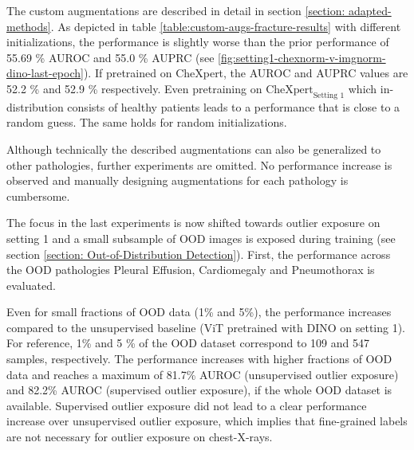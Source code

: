 The custom augmentations are described in detail in section \ref{section: adapted-methods}.
As depicted in table \ref{table:custom-augs-fracture-results} with different initializations, the performance is slightly worse than the prior performance of 55.69 \% AUROC  and 55.0 \% AUPRC (see \ref{fig:setting1-chexnorm-v-imgnorm-dino-last-epoch}).
If pretrained on CheXpert, the AUROC and AUPRC values are 52.2 \% and 52.9 \% respectively. 
Even pretraining on $\text{CheXpert}_\text{Setting 1}$ which in-distribution consists of healthy patients leads to a performance that is close to a random guess.
The same holds for random initializations.
\par
Although technically the described augmentations can also be generalized to other pathologies, further experiments are omitted.
No performance increase is observed and manually designing augmentations for each pathology is cumbersome.
\par
The focus in the last experiments is now shifted towards outlier exposure on setting 1 and a small subsample of OOD images is exposed during training (see section \ref{section: Out-of-Distribution Detection}).
First, the performance across the OOD pathologies Pleural Effusion, Cardiomegaly and Pneumothorax is evaluated.
\par
Even for small fractions of OOD data (1\% and 5\%), the performance increases compared to the unsupervised baseline (ViT pretrained with DINO on setting 1).
For reference, 1\% and 5 \% of the OOD dataset correspond to 109 and 547 samples, respectively.
The performance increases with higher fractions of OOD data and reaches a maximum of 81.7\% AUROC (unsupervised outlier exposure) and 82.2\% AUROC (supervised outlier exposure), if the whole OOD dataset is available.
Supervised outlier exposure did not lead to a clear performance increase over unsupervised outlier exposure, which implies that fine-grained labels are not necessary for outlier exposure on chest-X-rays.
